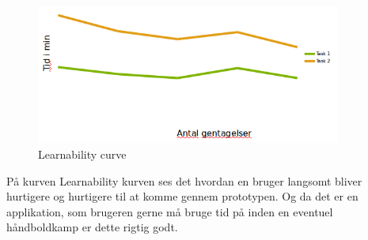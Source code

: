 \newpage
\begin{figure}[ht!]
\centering
\includegraphics[width=100mm]{images/learnability}
\caption{Learnability curve}
\end{figure}
På kurven Learnability kurven ses det hvordan en bruger langsomt bliver hurtigere og hurtigere til at komme gennem prototypen. Og da det er en applikation, som brugeren gerne må bruge tid på inden en eventuel håndboldkamp er dette rigtig godt.



